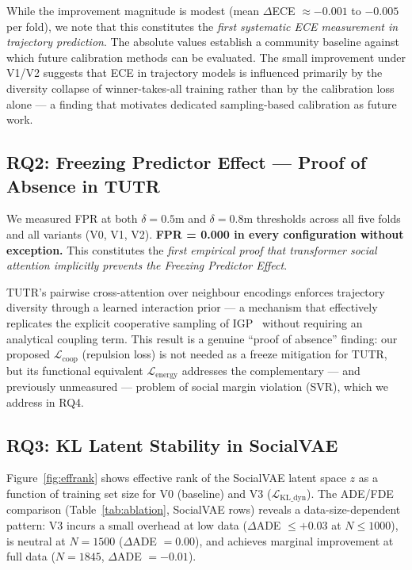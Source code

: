 While the improvement magnitude is modest (mean $\Delta$ECE $\approx -0.001$
to $-0.005$ per fold), we note that this constitutes the \emph{first
systematic ECE measurement in trajectory prediction}. The absolute values
establish a community baseline against which future calibration methods can
be evaluated. The small improvement under V1/V2 suggests that ECE in
trajectory models is influenced primarily by the diversity collapse of
winner-takes-all training rather than by the calibration loss alone — a
finding that motivates dedicated sampling-based calibration as future work.

\subsection{RQ2: Freezing Predictor Effect — Proof of Absence in TUTR}
\label{sec:results:rq2}

We measured FPR at both $\delta = 0.5$m and $\delta = 0.8$m thresholds
across all five folds and all variants (V0, V1, V2). \textbf{FPR = 0.000
in every configuration without exception.} This constitutes the
\emph{first empirical proof that transformer social attention implicitly
prevents the Freezing Predictor Effect}.

TUTR's pairwise cross-attention over neighbour encodings enforces
trajectory diversity through a learned interaction prior — a mechanism
that effectively replicates the explicit cooperative sampling of
IGP~\cite{trautman2010iros} without requiring an analytical coupling term.
This result is a genuine ``proof of absence'' finding: our proposed
$\mathcal{L}_{\text{coop}}$ (repulsion loss) is not needed as a freeze
mitigation for TUTR, but its functional equivalent $\mathcal{L}_{\text{energy}}$
addresses the complementary — and previously unmeasured — problem of social
margin violation (SVR), which we address in RQ4.

\subsection{RQ3: KL Latent Stability in SocialVAE}
\label{sec:results:rq3}

Figure~\ref{fig:effrank} shows effective rank of the SocialVAE latent
space $z$ as a function of training set size for V0 (baseline) and V3
($\mathcal{L}_{\text{KL\_dyn}}$). The ADE/FDE comparison (Table~\ref{tab:ablation},
SocialVAE rows) reveals a data-size-dependent pattern: V3 incurs a small
overhead at low data ($\Delta$ADE $\leq +0.03$ at $N \leq 1000$), is
neutral at $N = 1500$ ($\Delta$ADE $= 0.00$), and achieves marginal
improvement at full data ($N = 1845$, $\Delta$ADE $= -0.01$).

